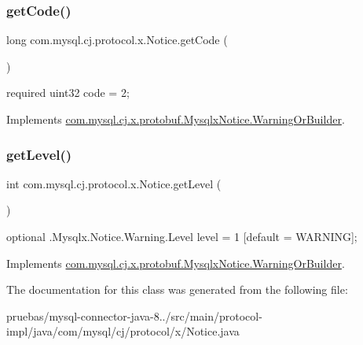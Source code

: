 \subsubsection{\texorpdfstring{get\+Code()}{getCode()}}
{\footnotesize\ttfamily long com.\+mysql.\+cj.\+protocol.\+x.\+Notice.\+get\+Code (\begin{DoxyParamCaption}{ }\end{DoxyParamCaption})}

{\ttfamily required uint32 code = 2;} 

Implements \mbox{\hyperlink{interfacecom_1_1mysql_1_1cj_1_1x_1_1protobuf_1_1_mysqlx_notice_1_1_warning_or_builder_a80bf4dbca6d4308c375bd55ded86b996}{com.\+mysql.\+cj.\+x.\+protobuf.\+Mysqlx\+Notice.\+Warning\+Or\+Builder}}.

\mbox{\label{classcom_1_1mysql_1_1cj_1_1protocol_1_1x_1_1_notice_adfa9327778b49a0e05d9a9620263e622}} 
\subsubsection{\texorpdfstring{get\+Level()}{getLevel()}}
{\footnotesize\ttfamily int com.\+mysql.\+cj.\+protocol.\+x.\+Notice.\+get\+Level (\begin{DoxyParamCaption}{ }\end{DoxyParamCaption})}

{\ttfamily optional .Mysqlx.\+Notice.\+Warning.\+Level level = 1 \mbox{[}default = W\+A\+R\+N\+I\+NG\mbox{]};} 

Implements \mbox{\hyperlink{interfacecom_1_1mysql_1_1cj_1_1x_1_1protobuf_1_1_mysqlx_notice_1_1_warning_or_builder_a01c6919aa5afa32d4bcba4407b783a7e}{com.\+mysql.\+cj.\+x.\+protobuf.\+Mysqlx\+Notice.\+Warning\+Or\+Builder}}.



The documentation for this class was generated from the following file\+:\begin{DoxyCompactItemize}
\item 
pruebas/mysql-\/connector-\/java-\/8../src/main/protocol-\/impl/java/com/mysql/cj/protocol/x/Notice.\+java\end{DoxyCompactItemize}
